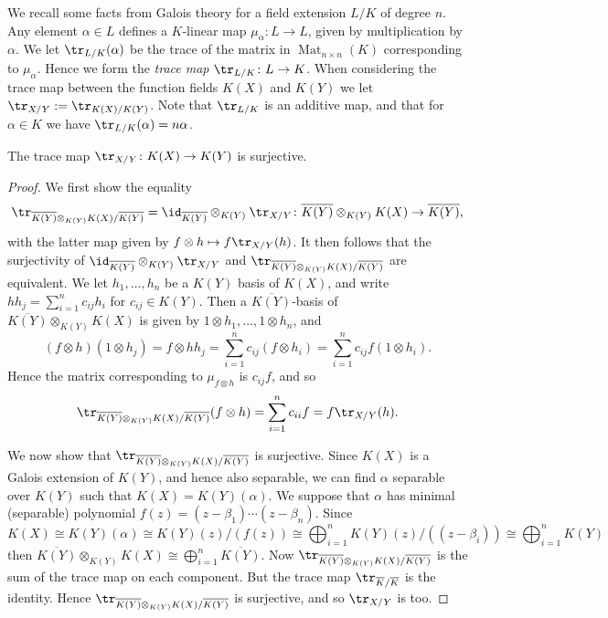 We recall some facts from Galois theory for a field extension $L/K$ of degree $n$.
Any element $\alpha \in L$ defines a $K$-linear map $\mu_{\alpha} \colon  L \rightarrow L$, given by multiplication by $\alpha$.
We let $\tr_{L/K}(\alpha)$ be the trace of the matrix in $\operatorname{Mat}_{n \times n}(K)$ corresponding to $\mu_\alpha$.
Hence we form the {\em trace map} $\tr_{L/K}\colon L \ra K$.
When considering the trace map between the function fields $K(X)$ and $K(Y)$ we let $\tr_{X/Y} := \tr_{K(X)/K(Y)}$.
Note that $\tr_{L/K}$ is an additive map, and that for $\alpha \in K$ we have $\tr_{L/K}(\alpha) = n \alpha$.
    \begin{prop}\label{proptracelemmasurjective}
    The trace map $\tr_{X/Y} \colon K(X) \ra K(Y)$ is surjective.
    \end{prop}
    \begin{proof}
    We first show the equality 
        \[
        \tr_{\overline{K(Y)}\otimes_{K(Y)}K(X)/\overline{K(Y)}} = \id_{\overline{K(Y)}}\otimes _{K(Y)} \tr_{X/Y} \colon \overline{K(Y)}\otimes_{K(Y)}K(X) \ra \overline{K(Y)},
        \]
    with the latter map given by $f\otimes h \mapsto f\tr_{X/Y}(h)$.
    It then follows that the surjectivity of $\id_{\overline{K(Y)}}\otimes _{K(Y)} \tr_{X/Y}$ and $\tr_{\overline{K(Y)}\otimes_{K(Y)}K(X)/\overline{K(Y)}}$ are equivalent.
    We let $h_1, \ldots, h_n$ be a $K(Y)$ basis of $K(X)$, and write $hh_j = \sum_{i=1}^n c_{ij}h_i$ for $c_{ij} \in K(Y)$.
    Then a $\overline{K(Y)}$-basis of $\overline{K(Y)}\otimes_{K(Y)}K(X)$ is given by $1 \otimes h_1, \ldots, 1 \otimes h_n$, and 
        \[
        (f \otimes h)(1\otimes h_j) = f \otimes hh_j = \sum_{i=1}^n c_{ij}(f \otimes h_i) = \sum_{i=1}^n c_{ij}f(1 \otimes h_i).
        \]  
    Hence the matrix corresponding to $\mu_{f \otimes h}$ is $c_{ij}f$, and so
        \[
        \tr_{\overline{K(Y)}\otimes_{K(Y)}K(X)/\overline{K(Y)}}(f \otimes h) = \sum_{i=1}^n c_{ii}f = f \tr_{X/Y}(h).
        \]  

    We now show that $\tr_{\overline{K(Y)}\otimes_{K(Y)}K(X)/\overline{K(Y)}}$ is surjective.
    Since $K(X)$ is a Galois extension of $K(Y)$, and hence also separable, we can find $\alpha$ separable over $K(Y)$ such that $K(X) = K(Y)(\alpha)$.
    We suppose that $\alpha$ has minimal (separable) polynomial ${f(z) = (z - \beta_1)\cdots (z - \beta_n)}$.
    Since
        \[
        K(X) \cong K(Y)(\alpha) \cong K(Y)(z)/(f(z)) \cong \bigoplus_{i=1}^n K(Y)(z)/((z-\beta_i)) \cong \bigoplus_{i=1}^n K(Y)
        \]  
    then $\overline{K(Y)}\otimes_{K(Y)} K(X) \cong \bigoplus_{i=1}^n \overline{K(Y)}$.
    Now $\tr_{\overline{K(Y)}\otimes_{K(Y)}K(X)/\overline{K(Y)}}$ is the sum of the trace map on each component.
    But the trace map $\tr_{\overline{K}/\overline{K}}$ is the identity.
    Hence $\tr_{\overline{K(Y)}\otimes_{K(Y)}K(X)/\overline{K(Y)}}$ is surjective, and so $\tr_{X/Y}$ is too.
    \end{proof}

